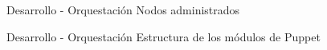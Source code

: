 \begin{frame}{Desarrollo - Orquestación}
    \vspace{0cm} {Nodos administrados}
    \vspace{0cm}
    \begin{figure}[ht]
       \centering
    \end{figure}

\end{frame}

\begin{frame}{Desarrollo - Orquestación}
    \vspace{0cm} {Estructura de los módulos de Puppet}
    \vspace{0cm}
    \begin{figure}[ht]
       \centering
    \end{figure}

\end{frame}

